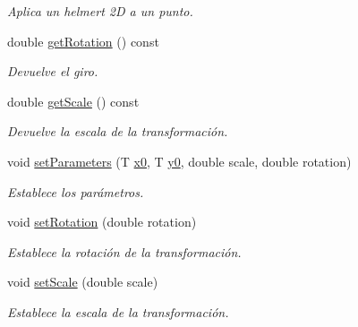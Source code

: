 \begin{DoxyCompactItemize}
\begin{DoxyCompactList}\small\item\em Aplica un helmert 2D a un punto. \end{DoxyCompactList}\item 
double \hyperlink{class_i3_d_1_1_helmert2_d_a7f96184b77dfd19734906e8ea79ec74f}{get\+Rotation} () const 
\begin{DoxyCompactList}\small\item\em Devuelve el giro. \end{DoxyCompactList}\item 
double \hyperlink{class_i3_d_1_1_helmert2_d_ad748a42c6267e30b8dc009714cc07559}{get\+Scale} () const 
\begin{DoxyCompactList}\small\item\em Devuelve la escala de la transformación. \end{DoxyCompactList}\item 
void \hyperlink{group__trf2_d_group_ga792554ed5f33a824b0c619e156697022}{set\+Parameters} (T \hyperlink{class_i3_d_1_1_helmert2_d_ad0bb6ad335ff383cf85f29a3da60c2e7}{x0}, T \hyperlink{class_i3_d_1_1_helmert2_d_a60ddf8a70434410bc53e610abf583dbe}{y0}, double scale, double rotation)
\begin{DoxyCompactList}\small\item\em Establece los parámetros. \end{DoxyCompactList}\item 
void \hyperlink{group__trf2_d_group_gaf7d2a6c0aeeb81c66b8e07e55236a6d2}{set\+Rotation} (double rotation)
\begin{DoxyCompactList}\small\item\em Establece la rotación de la transformación. \end{DoxyCompactList}\item 
void \hyperlink{group__trf2_d_group_gaa732c2f1d68f41b1ab4ca63aa40b21df}{set\+Scale} (double scale)
\begin{DoxyCompactList}\small\item\em Establece la escala de la transformación. \end{DoxyCompactList}\end{DoxyCompactItemize}
